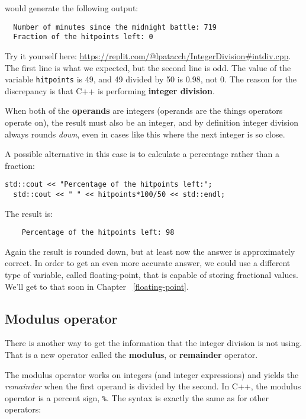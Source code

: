 would generate the following output:

\begin{verbatim}
  Number of minutes since the midnight battle: 719
  Fraction of the hitpoints left: 0
\end{verbatim}
%
Try it yourself here: \url{https://replit.com/@lpatacch/IntegerDivision#intdiv.cpp}.
The first line is what we expected, but the second line is
odd.  The value of the variable {\tt hitpoints} is 49, and
49 divided by 50 is 0.98, not 0.  The reason for the
discrepancy is that C++ is performing {\bf integer division}.


When both of the {\bf operands} are integers (operands are the things
operators operate on), the result must also be an integer,
and by definition integer division always rounds {\em down},
even in cases like this where the next integer is so close.

A possible alternative in this case is to calculate a percentage
rather than a fraction:

\begin{lstlisting}[frame=single]
  std::cout << "Percentage of the hitpoints left:";
  std::cout << " " << hitpoints*100/50 << std::endl;
\end{lstlisting}

%
The result is:

\begin{verbatim}
    Percentage of the hitpoints left: 98
\end{verbatim}
%
Again the result is rounded down, but at least now the answer
is approximately correct.  In order to get an even more accurate
answer, we could use a different type of variable, called
floating-point, that is capable of storing fractional values.
We'll get to that soon in Chapter ~\ref{floating-point}.

\subsection{Modulus operator}
\label{modulus}
There is another way to get the information that the integer division is not using. That is a new operator called the {\bf modulus}, or {\bf remainder} operator.

The modulus operator works on integers (and integer expressions)
and yields the {\em remainder} when the first operand is divided
by the second.  In C++, the modulus operator is a percent sign,
{\tt \%}.  The syntax is exactly the same as for other operators:

